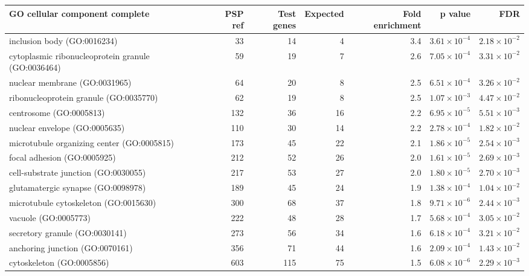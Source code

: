 \begin{table}[ht]
\centering
\begin{adjustbox}{width=\textwidth}


\begin{tabular}{lrrrrrr}
  \hline
GO cellular component complete & PSP ref & Test genes & Expected & Fold enrichment & p value & FDR \\ 
  \hline
inclusion body (GO:0016234) & 33 & 14 & 4 & 3.4 & $3.61 \times 10^{-4}$ & $2.18 \times 10^{-2}$ \\ 
  cytoplasmic ribonucleoprotein granule (GO:0036464) & 59 & 19 & 7 & 2.6 & $7.05 \times 10^{-4}$ & $3.31 \times 10^{-2}$ \\ 
  nuclear membrane (GO:0031965) & 64 & 20 & 8 & 2.5 & $6.51 \times 10^{-4}$ & $3.26 \times 10^{-2}$ \\ 
  ribonucleoprotein granule (GO:0035770) & 62 & 19 & 8 & 2.5 & $1.07 \times 10^{-3}$ & $4.47 \times 10^{-2}$ \\ 
  centrosome (GO:0005813) & 132 & 36 & 16 & 2.2 & $6.95 \times 10^{-5}$ & $5.51 \times 10^{-3}$ \\ 
  nuclear envelope (GO:0005635) & 110 & 30 & 14 & 2.2 & $2.78 \times 10^{-4}$ & $1.82 \times 10^{-2}$ \\ 
  microtubule organizing center (GO:0005815) & 173 & 45 & 22 & 2.1 & $1.86 \times 10^{-5}$ & $2.54 \times 10^{-3}$ \\ 
  focal adhesion (GO:0005925) & 212 & 52 & 26 & 2.0 & $1.61 \times 10^{-5}$ & $2.69 \times 10^{-3}$ \\ 
  cell-substrate junction (GO:0030055) & 217 & 53 & 27 & 2.0 & $1.80 \times 10^{-5}$ & $2.70 \times 10^{-3}$ \\ 
  glutamatergic synapse (GO:0098978) & 189 & 45 & 24 & 1.9 & $1.38 \times 10^{-4}$ & $1.04 \times 10^{-2}$ \\ 
  microtubule cytoskeleton (GO:0015630) & 300 & 68 & 37 & 1.8 & $9.71 \times 10^{-6}$ & $2.44 \times 10^{-3}$ \\ 
  vacuole (GO:0005773) & 222 & 48 & 28 & 1.7 & $5.68 \times 10^{-4}$ & $3.05 \times 10^{-2}$ \\ 
  secretory granule (GO:0030141) & 273 & 56 & 34 & 1.6 & $6.18 \times 10^{-4}$ & $3.21 \times 10^{-2}$ \\ 
  anchoring junction (GO:0070161) & 356 & 71 & 44 & 1.6 & $2.09 \times 10^{-4}$ & $1.43 \times 10^{-2}$ \\ 
  cytoskeleton (GO:0005856) & 603 & 115 & 75 & 1.5 & $6.08 \times 10^{-6}$ & $2.29 \times 10^{-3}$ \\ 

\end{tabular}
\end{adjustbox}
\end{table}
